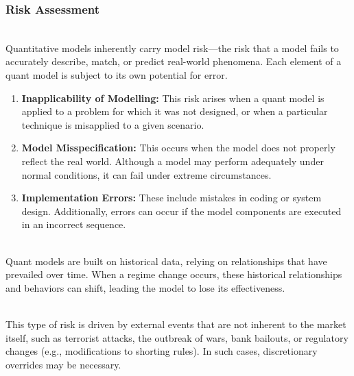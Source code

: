 \subsubsection{Risk Assessment}

\begin{definition} \\
Quantitative models inherently carry model risk—the risk that a model fails to accurately describe, match, or predict real-world phenomena. Each element of a quant model is subject to its own potential for error.
\begin{enumerate}[label=\roman*.]
\setlength{\itemsep}{0pt}
  \item \textbf{Inapplicability of Modelling:} This risk arises when a quant model is applied to a problem for which it was not designed, or when a particular technique is misapplied to a given scenario.
  \item \textbf{Model Misspecification:} This occurs when the model does not properly reflect the real world. Although a model may perform adequately under normal conditions, it can fail under extreme circumstances.
  \item \textbf{Implementation Errors:} These include mistakes in coding or system design. Additionally, errors can occur if the model components are executed in an incorrect sequence.
\end{enumerate}
\end{definition}

\begin{definition} \\
Quant models are built on historical data, relying on relationships that have prevailed over time. When a regime change occurs, these historical relationships and behaviors can shift, leading the model to lose its effectiveness.
\end{definition}

\begin{definition} \\	
This type of risk is driven by external events that are not inherent to the market itself, such as terrorist attacks, the outbreak of wars, bank bailouts, or regulatory changes (e.g., modifications to shorting rules). In such cases, discretionary overrides may be necessary.
\end{definition}

